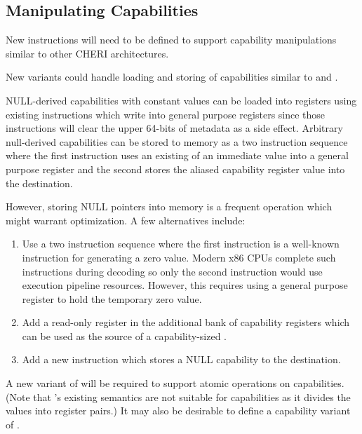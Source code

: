 \subsection{Manipulating Capabilities}

New instructions will need to be defined to support capability
manipulations similar to other CHERI architectures.

New  variants could handle loading and storing of
capabilities similar to  and .

NULL-derived capabilities with constant values can be loaded into
registers using existing  instructions which
write into general purpose registers since those instructions will
clear the upper 64-bits of metadata as a side effect.  Arbitrary
null-derived capabilities can be stored to memory as a two instruction
sequence where the first instruction uses an existing
 of an immediate value into a general purpose
register and the second stores the aliased capability register value
into the destination.

However, storing NULL pointers into memory is a frequent operation
which might warrant optimization.  A few alternatives include:

\begin{enumerate}
  \item Use a two instruction sequence where the first instruction is
    a well-known instruction for generating a zero value.  Modern
    x86 CPUs complete such instructions during decoding so only the
    second instruction would use execution pipeline resources.
    However, this requires using a general purpose register to hold
    the temporary zero value.

  \item Add a read-only \CNULL register in the additional bank of
    capability registers which can be used as the source of a
    capability-sized .

  \item Add a new  instruction which stores
    a NULL capability to the destination.
\end{enumerate}

A new variant of  will be required to support
atomic operations on capabilities.  (Note that 's
existing semantics are not suitable for capabilities
as it divides the values into register pairs.)  It may also be
desirable to define a capability variant of .


